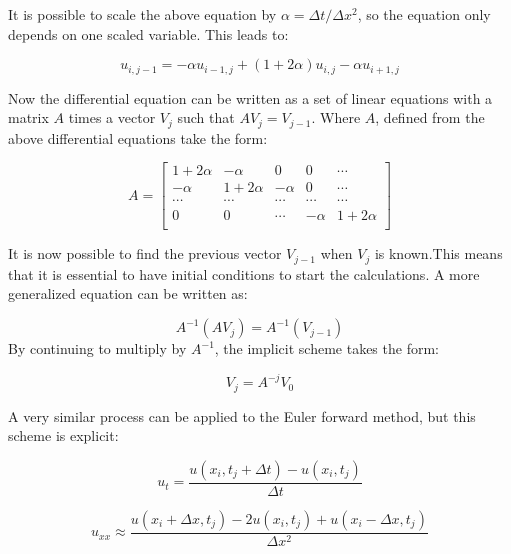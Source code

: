 \documentclass[10pt,a4paper]{article}
\begin{document}
\noindent It is possible to scale the above equation by $\alpha = \Delta t / \Delta x^2$, so the equation only depends on one scaled variable. This leads to:

\begin{equation}
u_{i,j-1} = -\alpha u_{i-1,j} + (1 + 2\alpha)u_{i,j} - \alpha u_{i+1,j}
\end{equation}

\noindent Now the differential equation can be written as a set of linear equations with a matrix $A$ times a vector $V_j$ such that $AV_j = V_{j-1}$. Where $A$, defined from the above differential equations take the form:

\begin{equation}
A = \begin{bmatrix}
1 + 2\alpha & -\alpha & 0 & 0 &\cdots\\
-\alpha & 1 + 2\alpha & -\alpha & 0 & \cdots\\
\cdots & \cdots & \cdots & \cdots & \cdots\\
0 & 0 & \cdots & -\alpha & 1 + 2\alpha\\

\end{bmatrix}
\end{equation}

\noindent It is now possible to find the previous vector $V_{j-1}$ when $V_j$ is known.This means that it is essential to have initial conditions to start the calculations. A more generalized equation can be written as:

\begin{equation}
A^{-1}(AV_j) = A^{-1}(V_{j-1})
\end{equation}
\noindent By continuing to multiply by $A^{-1}$, the implicit scheme takes the form:

\begin{equation}
V_j = A^{-j}V_0
\end{equation}

\noindent A very similar process can be applied to the Euler forward method, but this scheme is explicit:

\begin{equation}
u_t = \frac{u(x_i,t_j + \Delta t) - u(x_i,t_j)}{\Delta t}
\end{equation}

\begin{equation}
u_{xx} \approx \frac{u(x_i + \Delta x,t_j) - 2u(x_i,t_j) + u(x_i - \Delta x,t_j)}{\Delta x^2} 
\end{equation}
\end{document}
